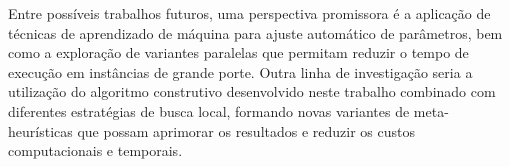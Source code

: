 Entre possíveis trabalhos futuros, uma perspectiva promissora é a aplicação de técnicas de aprendizado de máquina para ajuste automático de parâmetros, bem como a exploração de variantes paralelas que permitam reduzir o tempo de execução em instâncias de grande porte. Outra linha de investigação seria a utilização do algoritmo construtivo desenvolvido neste trabalho combinado com diferentes estratégias de busca local, formando novas variantes de meta-heurísticas que possam aprimorar os resultados e reduzir os custos computacionais e temporais.